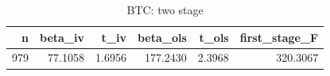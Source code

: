 \begin{table}
\caption{BTC: two stage}
\label{tab:t7_two_stage_BTC}
\begin{tabular}{rrrrrr}
\toprule
n & beta\_iv & t\_iv & beta\_ols & t\_ols & first\_stage\_F \\
\midrule
979 & 77.1058 & 1.6956 & 177.2430 & 2.3968 & 320.3067 \\
\bottomrule
\end{tabular}
\end{table}

